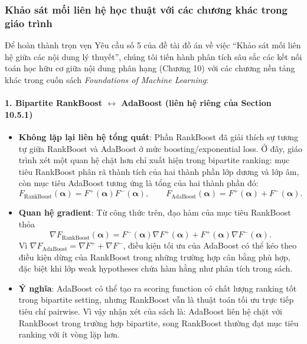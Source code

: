 \subsubsection{Khảo sát mối liên hệ học thuật với các chương khác trong giáo trình}
\label{sec:connections}

Để hoàn thành trọn vẹn Yêu cầu số 5 của đề tài đồ án về việc ``Khảo sát mối liên hệ giữa các nội dung lý thuyết'', chúng tôi tiến hành phân tích sâu sắc các kết nối toán học hữu cơ giữa nội dung phân hạng (Chương 10) với các chương nền tảng khác trong cuốn sách \textit{Foundations of Machine Learning}:

\paragraph{1. Bipartite RankBoost $\leftrightarrow$ AdaBoost (liên hệ riêng của Section 10.5.1)}
\begin{itemize}
    \item \textbf{Không lặp lại liên hệ tổng quát}: Phần RankBoost đã giải thích sự tương tự giữa RankBoost và AdaBoost ở mức boosting/exponential loss. Ở đây, giáo trình xét một quan hệ chặt hơn chỉ xuất hiện trong bipartite ranking: mục tiêu RankBoost phân rã thành tích của hai thành phần lớp dương và lớp âm, còn mục tiêu AdaBoost tương ứng là tổng của hai thành phần đó:
    \[
        F_{\mathrm{RankBoost}}(\bm{\alpha})
        =
        F^+(\bm{\alpha})F^-(\bm{\alpha}),
        \qquad
        F_{\mathrm{AdaBoost}}(\bm{\alpha})
        =
        F^+(\bm{\alpha})+F^-(\bm{\alpha}).
    \]
    \item \textbf{Quan hệ gradient}: Từ công thức trên, đạo hàm của mục tiêu RankBoost thỏa
    \[
        \nabla F_{\mathrm{RankBoost}}(\bm{\alpha})
        =
        F^-(\bm{\alpha})\nabla F^+(\bm{\alpha})
        +
        F^+(\bm{\alpha})\nabla F^-(\bm{\alpha}).
    \]
    Vì $\nabla F_{\mathrm{AdaBoost}}=\nabla F^+ + \nabla F^-$, điều kiện tối ưu của AdaBoost có thể kéo theo điều kiện dừng của RankBoost trong những trường hợp cân bằng phù hợp, đặc biệt khi lớp weak hypotheses chứa hàm hằng như phân tích trong sách.
    \item \textbf{Ý nghĩa}: AdaBoost có thể tạo ra scoring function có chất lượng ranking tốt trong bipartite setting, nhưng RankBoost vẫn là thuật toán tối ưu trực tiếp tiêu chí pairwise. Vì vậy nhận xét của sách là: AdaBoost liên hệ chặt với RankBoost trong trường hợp bipartite, song RankBoost thường đạt mục tiêu ranking với ít vòng lặp hơn.
\end{itemize}

